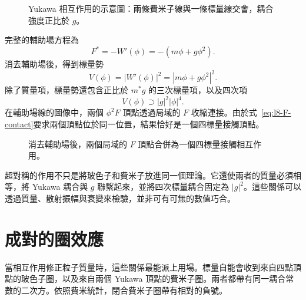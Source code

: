 \begin{figure}[H]
\centering
{}
\caption{Yukawa 相互作用的示意圖：兩條費米子線與一條標量線交會，耦合強度正比於 \(g\)。}
\end{figure}

完整的輔助場方程為
\begin{equation}
F^\ast=-W'(\phi)=-(m\phi+g\phi^2).
\label{eq:l8-general-F-equation}
\end{equation}
消去輔助場後，得到標量勢
\begin{equation}
V(\phi)=|W'(\phi)|^2
=|m\phi+g\phi^2|^2.
\label{eq:l8-scalar-potential}
\end{equation}
除了質量項，標量勢還包含正比於 \(m^\ast g\) 的三次標量項，以及四次項
\begin{equation}
V(\phi)\supset |g|^2|\phi|^4.
\label{eq:l8-quartic}
\end{equation}
在輔助場線的圖像中，兩個 \(\phi^2F\) 頂點透過局域的 \(F\) 收縮連接。由於式~\eqref{eq:l8-F-contact}要求兩個頂點位於同一位置，結果恰好是一個四標量接觸頂點。

\begin{figure}[H]
\centering
{}
\caption{消去輔助場後，兩個局域的 \(F\) 頂點合併為一個四標量接觸相互作用。}
\end{figure}

超對稱的作用不只是將玻色子和費米子放進同一個理論。它還使兩者的質量必須相等，將 Yukawa 耦合與 \(g\) 聯繫起來，並將四次標量耦合固定為 \(|g|^2\)。這些關係可以透過質量、散射振幅與衰變來檢驗，並非可有可無的數值巧合。

\section{成對的圈效應}

當相互作用修正粒子質量時，這些關係最能派上用場。標量自能會收到來自四點頂點的玻色子圈，以及來自兩個 Yukawa 頂點的費米子圈。兩者都帶有同一耦合常數的二次方。依照費米統計，閉合費米子圈帶有相對的負號。

